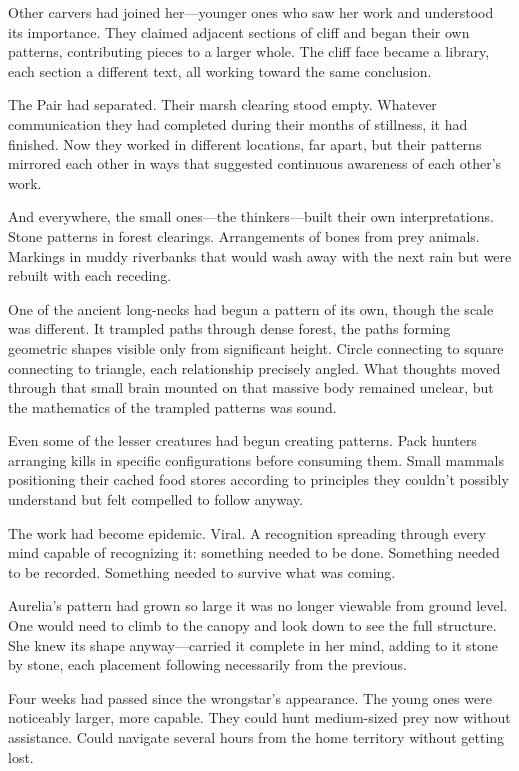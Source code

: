 Other carvers had joined her—younger ones who saw her work and understood its importance. They claimed adjacent sections of cliff and began their own patterns, contributing pieces to a larger whole. The cliff face became a library, each section a different text, all working toward the same conclusion.

The Pair had separated. Their marsh clearing stood empty. Whatever communication they had completed during their months of stillness, it had finished. Now they worked in different locations, far apart, but their patterns mirrored each other in ways that suggested continuous awareness of each other's work.

And everywhere, the small ones—the thinkers—built their own interpretations. Stone patterns in forest clearings. Arrangements of bones from prey animals. Markings in muddy riverbanks that would wash away with the next rain but were rebuilt with each receding.

One of the ancient long-necks had begun a pattern of its own, though the scale was different. It trampled paths through dense forest, the paths forming geometric shapes visible only from significant height. Circle connecting to square connecting to triangle, each relationship precisely angled. What thoughts moved through that small brain mounted on that massive body remained unclear, but the mathematics of the trampled patterns was sound.

Even some of the lesser creatures had begun creating patterns. Pack hunters arranging kills in specific configurations before consuming them. Small mammals positioning their cached food stores according to principles they couldn't possibly understand but felt compelled to follow anyway.

The work had become epidemic. Viral. A recognition spreading through every mind capable of recognizing it: something needed to be done. Something needed to be recorded. Something needed to survive what was coming.

\scenebreak

Aurelia's pattern had grown so large it was no longer viewable from ground level. One would need to climb to the canopy and look down to see the full structure. She knew its shape anyway—carried it complete in her mind, adding to it stone by stone, each placement following necessarily from the previous.

Four weeks had passed since the wrongstar's appearance. The young ones were noticeably larger, more capable. They could hunt medium-sized prey now without assistance. Could navigate several hours from the home territory without getting lost.


